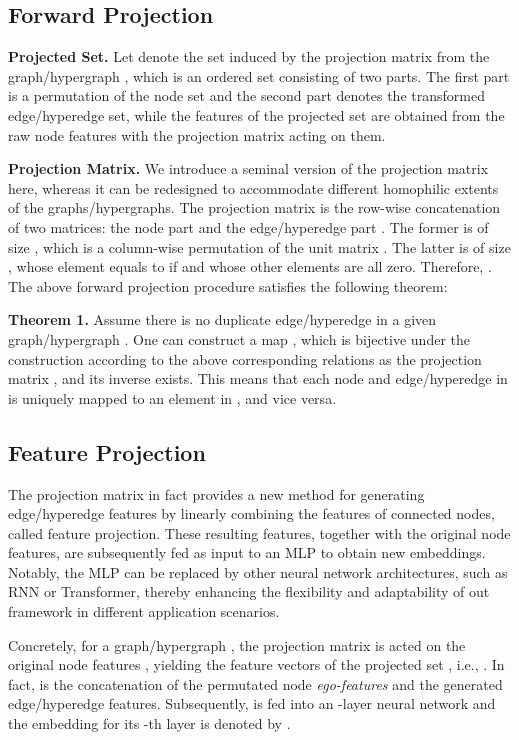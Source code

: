 \documentclass[review]{elsarticle}
\begin{document}
\subsection{Forward Projection}

\textbf{Projected Set.} Let  denote the set induced by the projection matrix from the graph/hypergraph , which is an ordered set consisting of two parts. The first part is a permutation of the node set  and the second part denotes the transformed edge/hyperedge set, while the features of the projected set are obtained from the raw node features with the projection matrix  acting on them.


\textbf{Projection Matrix.} We introduce a seminal version of the projection matrix here, whereas it can be redesigned to accommodate different homophilic extents of the graphs/hypergraphs. The projection matrix  is the row-wise concatenation of two matrices: the node part  and the edge/hyperedge part . The former is of size , which is a column-wise permutation of the unit matrix . The latter  is of size , whose element  equals to  if  and whose other elements are all zero. Therefore, . The above forward projection procedure satisfies the following theorem:

\textbf{Theorem 1.} Assume there is no duplicate edge/hyperedge in a given graph/hypergraph . One can construct a map , which is bijective under the construction according to the above corresponding relations as the projection matrix , and its inverse exists. This means that each node and edge/hyperedge in  is uniquely mapped to an element in , and vice versa.







\subsection{Feature Projection}

The projection matrix  in fact provides a new method for generating edge/hyperedge features by linearly combining the features of connected nodes, called feature projection. These resulting features, together with the original node features, are subsequently fed as input to an MLP to obtain new embeddings. Notably, the MLP can be replaced by other neural network architectures, such as RNN or Transformer, thereby enhancing the flexibility and adaptability of out framework in different application scenarios.

Concretely, for a graph/hypergraph , the projection matrix  is acted on the original node features , yielding the feature vectors of the projected set , i.e., . In fact,  is the concatenation of the permutated node \textit{ego-features} and the generated edge/hyperedge features. Subsequently,  is fed into an -layer neural network and the embedding for its -th layer is denoted by .
\end{document}
